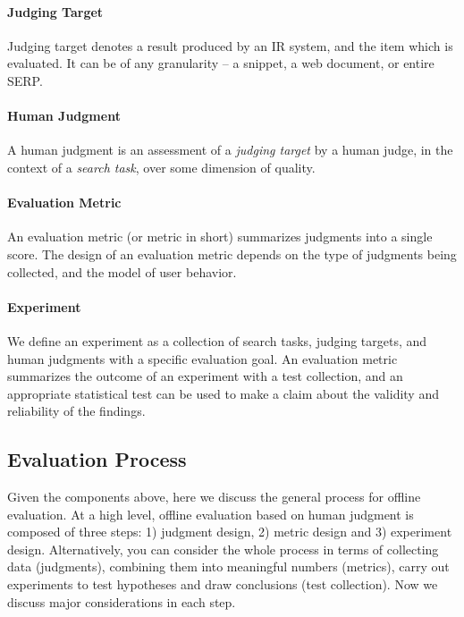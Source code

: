 \paragraph{Judging Target} Judging target denotes a result produced by an IR system, and the item which is evaluated. It can be of any granularity -- a snippet, a web document, or entire SERP. 

\paragraph{Human Judgment} A human judgment is an assessment of a \textit{judging target} by a human judge, in the context of a \textit{search task}, over some dimension of quality. 

\paragraph{Evaluation Metric} An evaluation metric (or metric in short) summarizes judgments into a single score. The design of an evaluation metric depends on the type of judgments being collected, and the model of user behavior.

\paragraph{Experiment} We define an experiment as a collection of search tasks, judging targets, and human judgments with a specific evaluation goal. An evaluation metric summarizes the outcome of an experiment with a test collection, and an appropriate statistical test can be used to make a claim about the validity and reliability of the findings.

\subsection{Evaluation Process}
Given the components above, here we discuss the general process for offline evaluation. At a high level, offline evaluation based on human judgment is composed of three steps: 1) judgment design, 2) metric design and 3) experiment design. Alternatively, you can consider the whole process in terms of collecting data (judgments), combining them into meaningful numbers (metrics), carry out experiments to test hypotheses and draw conclusions (test collection). Now we discuss major considerations in each step.%

